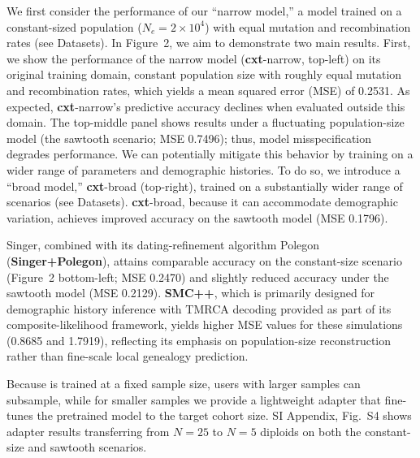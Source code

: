 \documentclass[9pt,twocolumn,twoside]{pnas-new}
\begin{document}
We first consider the performance of our ``narrow model,'' a \cxtkit{}
model trained on a constant-sized population (\(N_e = 2 \times 10^{4}\))
with equal mutation and recombination rates (see Datasets).
In Figure~2, we aim to demonstrate two main results.
First, we show the performance of the narrow model (\textbf{cxt}-narrow, top-left)
on its original training domain, constant population size with roughly equal
mutation and recombination rates, which yields a mean squared error (MSE) of 0.2531.
As expected, \textbf{cxt}-narrow's predictive accuracy declines when evaluated
outside this domain. The top-middle panel shows results under a fluctuating
population-size model (the sawtooth scenario; MSE 0.7496); thus, model
misspecification degrades performance.
We can potentially mitigate this behavior by training \cxtkit{} on a wider range
of parameters and demographic histories. To do so, we introduce a ``broad model,''
\textbf{cxt}-broad (top-right), trained on a substantially wider range of scenarios
(see Datasets). 
\textbf{cxt}-broad, because it can accommodate demographic variation,
achieves improved accuracy on the sawtooth model (MSE 0.1796). 


Singer, combined with its dating-refinement algorithm Polegon (\textbf{Singer+Polegon}), 
attains comparable accuracy on the constant-size scenario (Figure~2 bottom-left; MSE 0.2470)
and slightly reduced accuracy under the sawtooth model (MSE 0.2129). 
\textbf{SMC++}, which is primarily designed for demographic history inference with 
TMRCA decoding provided as part of its composite-likelihood framework, 
yields higher MSE values for these simulations (0.8685 and 1.7919), 
reflecting its emphasis on population-size reconstruction rather than fine-scale local genealogy prediction.

Because \cxtkit is trained at a fixed sample size, users with larger samples can subsample,
while for smaller samples we provide a lightweight adapter that fine-tunes the pretrained model
to the target cohort size.
SI Appendix, Fig.~S4 shows adapter results transferring from $N=25$ to $N=5$ diploids
on both the constant-size and sawtooth scenarios.


\end{document}

